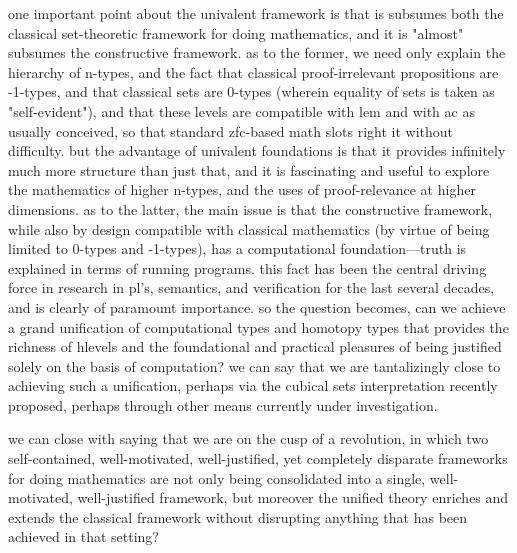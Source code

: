 \documentclass[11pt]{article}
\theoremstyle{remark}
\theoremstyle{definition}
\begin{document}
one important point about the univalent framework is that is subsumes both the classical set-theoretic framework for doing mathematics, and it is "almost" subsumes the constructive framework.  as to the former, we need only explain the hierarchy of n-types, and the fact that classical proof-irrelevant propositions are -1-types, and that classical sets are 0-types (wherein equality of sets is taken as "self-evident"), and that these levels are compatible with lem and with ac as usually conceived, so that standard zfc-based math slots right it without difficulty.  but the advantage of univalent foundations is that it provides infinitely much more structure than just that, and it is fascinating and useful to explore the mathematics of higher n-types, and the uses of proof-relevance at higher dimensions.  as to the latter, the main issue is that the constructive framework, while also by design compatible with classical mathematics (by virtue of being limited to 0-types and -1-types), has a computational foundation---truth is explained in terms of running programs.  this fact has been the central driving force in research in pl's, semantics, and verification for the last several decades, and is clearly of paramount importance.  so the question becomes, can we achieve a grand unification of computational types and homotopy types that provides the richness of hlevels and the foundational and practical pleasures of being justified solely on the basis of computation?  we can say that we are tantalizingly close to achieving such a unification, perhaps via the cubical sets interpretation recently proposed, perhaps through other means currently under investigation.

we can close with saying that we are on the cusp of a revolution, in which two self-contained, well-motivated, well-justified, yet completely disparate frameworks for doing mathematics are not only being consolidated into a single, well-motivated, well-justified framework, but moreover the unified theory enriches and extends the classical framework without disrupting anything that has been achieved in that setting?
\end{document}
